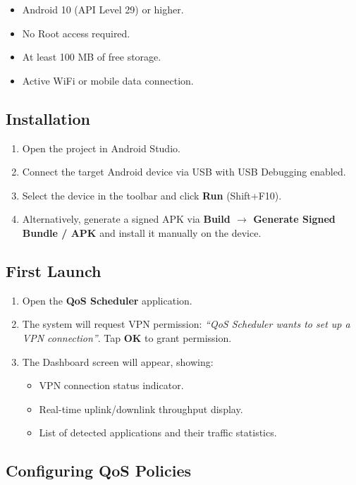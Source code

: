 \begin{itemize}
    \item Android 10 (API Level 29) or higher.
    \item No Root access required.
    \item At least 100 MB of free storage.
    \item Active WiFi or mobile data connection.
\end{itemize}

\subsection{Installation}

\begin{enumerate}
    \item Open the project in Android Studio.
    \item Connect the target Android device via USB with USB Debugging enabled.
    \item Select the device in the toolbar and click \textbf{Run} (Shift+F10).
    \item Alternatively, generate a signed APK via \textbf{Build $\rightarrow$ Generate Signed Bundle / APK} and install it manually on the device.
\end{enumerate}

\subsection{First Launch}

\begin{enumerate}
    \item Open the \textbf{QoS Scheduler} application.
    \item The system will request VPN permission: \textit{``QoS Scheduler wants to set up a VPN connection''}. Tap \textbf{OK} to grant permission.
    \item The Dashboard screen will appear, showing:
    \begin{itemize}
        \item VPN connection status indicator.
        \item Real-time uplink/downlink throughput display.
        \item List of detected applications and their traffic statistics.
    \end{itemize}
\end{enumerate}

\subsection{Configuring QoS Policies}

